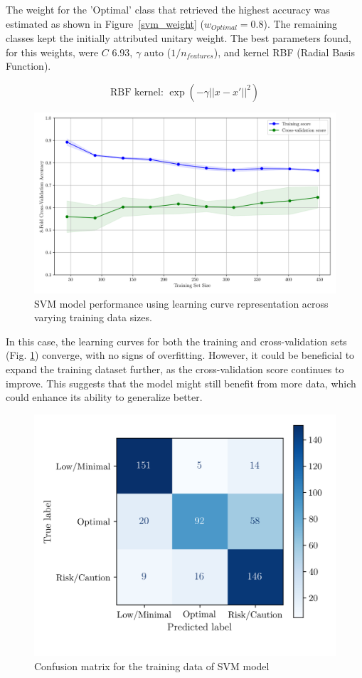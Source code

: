 \documentclass[conference]{IEEEtran}
\begin{document}
The weight for the 'Optimal' class that retrieved the highest accuracy was estimated as shown in Figure~\ref{svm_weight} ($w_{Optimal}=0.8$). The remaining classes kept the initially attributed unitary weight. The best parameters found, for this weights, were $C$ 6.93, $\gamma$ auto ($1/n_{features}$), and kernel RBF (Radial Basis Function).

$$\text{RBF kernel: } \exp(-\gamma ||x - x'||^2)$$

\begin{figure}[H]
    \centering
    \includegraphics[width=1\linewidth]{assets/SVM_LearningCurve.png}
    \caption{SVM model performance using learning curve representation across varying training data sizes.}
    \label{svm_learningcurve}
\end{figure}

In this case, the learning curves  for both the training and cross-validation sets (Fig. \ref{svm_learningcurve}) converge, with no signs of overfitting. However, it could be beneficial to expand the training dataset further, as the cross-validation score continues to improve. This suggests that the model might still benefit from more data, which could enhance its ability to generalize better.

\begin{figure}[H]
    \centering
    \includegraphics[width=1\linewidth]{assets/SVM_ConfusionMatrixTrain.png}
    \caption{Confusion matrix for the training data of SVM model}
    \label{svm_cm_train}
\end{figure}
\end{document}
